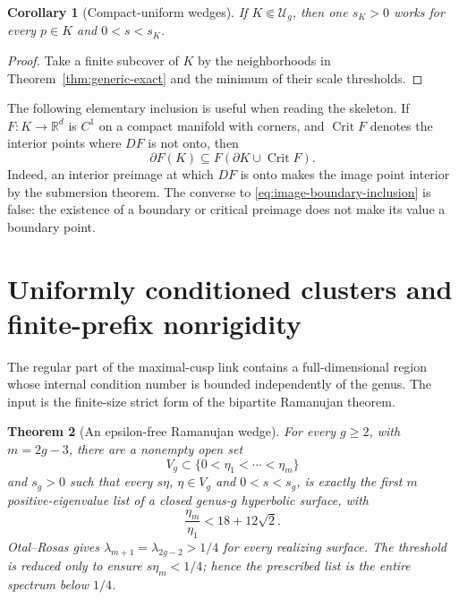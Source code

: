 \documentclass[11pt,reqno]{amsart}
\newtheorem{theorem}{Theorem}[section]
\newtheorem{corollary}[theorem]{Corollary}
\theoremstyle{definition}
\theoremstyle{remark}
\newcommand{\R}{\mathbb R}
\newcommand{\Crit}{\operatorname{Crit}}
\begin{document}
\begin{corollary}[Compact-uniform wedges]\label{cor:generic-compact}
If $K\Subset\mathcal U_g$, then one $s_K>0$ works for every
$p\in K$ and $0<s<s_K$.
\end{corollary}

\begin{proof}
Take a finite subcover of $K$ by the neighborhoods in
Theorem~\ref{thm:generic-exact} and the minimum of their scale thresholds.
\end{proof}

The following elementary inclusion is useful when reading the skeleton.
If $F:K\to\R^d$ is $C^1$ on a compact manifold with corners, and
$\Crit F$ denotes the interior points where $DF$ is not onto, then
\begin{equation}\label{eq:image-boundary-inclusion}
 \partial F(K)\subseteq F(\partial K\cup\Crit F).
\end{equation}
Indeed, an interior preimage at which $DF$ is onto makes the image point
interior by the submersion theorem.  The converse to
\eqref{eq:image-boundary-inclusion} is false: the existence of a boundary or
critical preimage does not make its value a boundary point.

\section{Uniformly conditioned clusters and finite-prefix nonrigidity}
\label{sec:conditioned-prefixes}

The regular part of the maximal-cusp link contains a full-dimensional region
whose internal condition number is bounded independently of the genus.  The
input is the finite-size strict form of the bipartite Ramanujan theorem.

\begin{theorem}[An epsilon-free Ramanujan wedge]
\label{thm:ramanujan-wedge}
For every $g\ge2$, with $m=2g-3$, there are a nonempty open set
\[
 V_g\subset\{0<\eta_1<\cdots<\eta_m\}
\]
and $s_g>0$ such that every $s\eta$, $\eta\in V_g$ and $0<s<s_g$, is
exactly the first $m$ positive-eigenvalue list of a closed genus-$g$
hyperbolic surface, with
\begin{equation}\label{eq:ramanujan-condition}
 \frac{\eta_m}{\eta_1}<18+12\sqrt2.
\end{equation}
Otal--Rosas gives $\lambda_{m+1}=\lambda_{2g-2}>1/4$ for every realizing
surface.  The threshold is reduced only to ensure $s\eta_m<1/4$; hence the
prescribed list is the entire spectrum below $1/4$.
\end{theorem}
\end{document}
